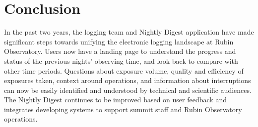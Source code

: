 \FloatBarrier
\section{Conclusion}

In the past two years, the logging team and Nightly Digest application have made
significant steps towards unifying the electronic logging landscape at Rubin Observatory.
Users now have a landing page to understand the progress and status of the previous
nights’ observing time, and look back to compare with other time periods. Questions about
exposure volume, quality and efficiency of exposures taken, context around operations, and
information about interruptions can now be easily identified and understood by technical
and scientific audiences. The Nightly Digest continues to be improved based on user
feedback and integrates developing systems to support summit staff and Rubin Observatory
operations.
